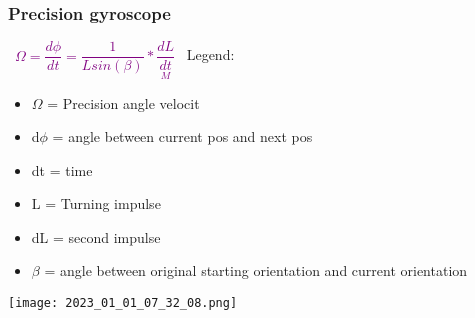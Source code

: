\documentclass[main.tex,fontsize=8pt,paper=a4,paper=portrait,DIV=calc,]{scrartcl}
\begin{document}
\begin{multicols*}{2}
\subsubsection{Precision gyroscope}
\, \newline
\large \textcolor{purple}{\( \Omega = \dfrac{d\phi}{dt} = \dfrac{1}{L sin(\beta)} * \underset{M}{\dfrac{dL}{dt}} \)}\newline
\, \newline
\normalsize Legend: \newline
\begin{itemize}
\item \(\Omega\) = Precision angle velocit
\item d\(\phi\) = angle between current pos and next pos
\item dt = time  
\item L = Turning impulse
\item dL = second impulse 
\item \(\beta\) = angle between original starting orientation and current orientation
\end{itemize}
\texttt{[image: 2023\_01\_01\_07\_32\_08.png]}

\end{multicols*}
\end{document}
